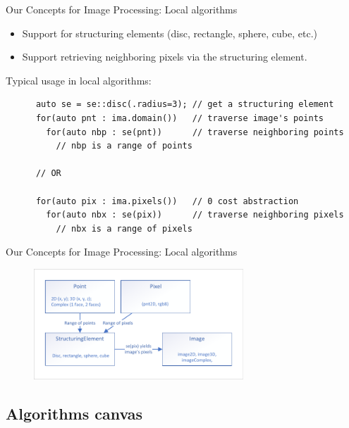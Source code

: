 \documentclass[12pt,aspectratio=169]{beamer}
\begin{document}
\begin{frame}[fragile]{Our Concepts for Image Processing: Local algorithms}
  \begin{itemize}
    \item Support for structuring elements (disc, rectangle, sphere, cube, etc.)
    \item Support retrieving neighboring pixels via the structuring element.
  \end{itemize}
  Typical usage in local algorithms:

  \begin{verbatim}
      auto se = se::disc(.radius=3); // get a structuring element
      for(auto pnt : ima.domain())   // traverse image's points
        for(auto nbp : se(pnt))      // traverse neighboring points
          // nbp is a range of points

      // OR

      for(auto pix : ima.pixels())   // 0 cost abstraction
        for(auto nbx : se(pix))      // traverse neighboring pixels
          // nbx is a range of pixels
  \end{verbatim}
\end{frame}

\begin{frame}[fragile]{Our Concepts for Image Processing: Local algorithms}
  \centering
  \begin{figure}
    \includegraphics[width=0.7\textwidth]{../figures/concepts/se_extension_rework}
  \end{figure}
\end{frame}

\subsection{Algorithms canvas}
\end{document}
